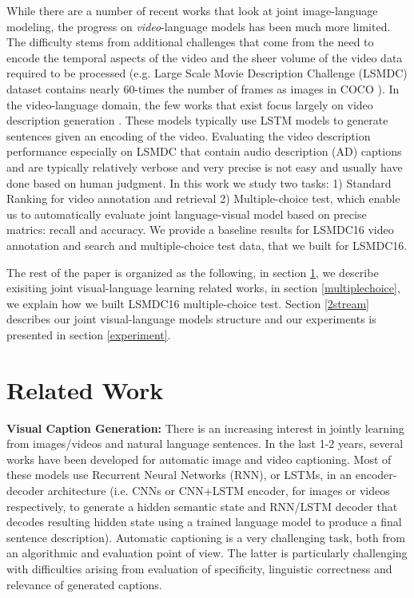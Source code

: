 \documentclass[runningheads]{llncs}
\begin{document}
While there are a number of recent works that look at joint image-language modeling, the progress on {\em video}-language models has been much more limited. The difficulty stems from additional challenges that come from the need to encode the temporal aspects of the video and the sheer volume of the video data required to be processed (e.g. Large Scale Movie Description Challenge (LSMDC) \cite{LSMDC15} dataset contains nearly 60-times the number of frames as images in COCO \cite{502}). In the video-language domain, the few works that exist focus largely on video description generation \cite{VenugopalanRDMD15,yao2015capgenvid}. These models typically use LSTM models to generate sentences given an encoding of the video. Evaluating the video description performance  especially on LSMDC that contain audio description (AD) captions and are typically relatively verbose and very precise is not easy and usually have done based on human judgment. In this work we study two tasks: 1) Standard Ranking for video annotation and retrieval 2) Multiple-choice test, which enable us to automatically evaluate joint language-visual model based on precise matrics: recall and accuracy. We provide a baseline results for LSMDC16 video annotation and search and multiple-choice test data, that we built for LSMDC16.

The rest of the paper is organized as the following, in section \ref{relatedwork}, we describe exisiting joint visual-language learning related works, in section \ref{multiplechoice}, we explain how we built LSMDC16 multiple-choice test. Section \ref{2stream} describes our joint visual-language models structure and our experiments is presented in section \ref{experiment}. 

\section{Related Work}
\label{relatedwork}
\noindent
{\bf Visual Caption Generation:}
There is an increasing interest in jointly learning from images/videos and natural language sentences. In the last 1-2 years, several works have been developed for automatic image \cite{chen15cvpr,donahue15cvpr,fang15cvpr,karpathy15cvpr,kiros15tacl,XuBKCCSZB15,vinyals15cvpr} and video \cite{VenugopalanRDMD15,yao2015capgenvid} captioning. Most of these models use Recurrent Neural Networks (RNN), or LSTMs, in an encoder-decoder architecture (i.e. CNNs or CNN+LSTM encoder, for images or videos respectively, to generate a hidden semantic state and RNN/LSTM decoder that decodes resulting hidden state using a trained language model to produce a final sentence description). Automatic captioning is a very challenging task, both from an algorithmic and evaluation point of view. The latter is particularly challenging with difficulties arising from evaluation of  specificity, linguistic correctness and relevance of generated captions. 
\end{document}
